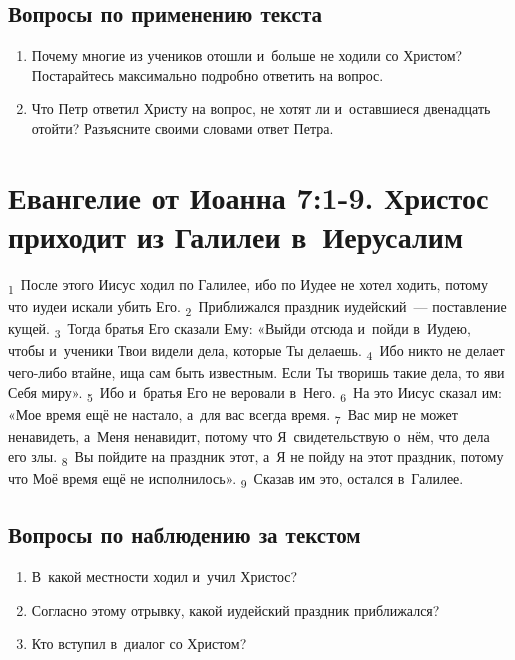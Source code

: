 \documentclass[a4paper,12pt]{article}
\begin{document}
\subsection*{Вопросы по применению текста} 
\begin{enumerate}
    \item Почему многие из учеников отошли и~больше не ходили со Христом? Постарайтесь максимально подробно ответить на вопрос. 
    
    \myline
    
    \myline
    \item Что Петр ответил Христу на вопрос, не хотят ли и~оставшиеся двенадцать отойти? Разъясните своими словами ответ Петра. 
    
    \myline
    
    \myline
\end{enumerate}



\section{Евангелие от Иоанна 7:1-9. Христос приходит из Галилеи в~Иерусалим}

 \textsubscript{1}~После этого Иисус ходил по Галилее, ибо по Иудее не хотел ходить, потому что иудеи искали убить Его. \textsubscript{2}~Приближался праздник иудейский~--- поставление кущей. \textsubscript{3}~Тогда братья Его сказали Ему: «Выйди отсюда и~пойди в~Иудею, чтобы и~ученики Твои видели дела, которые Ты делаешь. \textsubscript{4}~Ибо никто не делает чего-либо втайне, ища сам быть известным. Если Ты творишь такие дела, то яви Себя миру». \textsubscript{5}~Ибо и~братья Его не веровали в~Него. \textsubscript{6}~На это Иисус сказал им: «Мое время ещё не настало, а~для вас всегда время. \textsubscript{7}~Вас мир не может ненавидеть, а~Меня ненавидит, потому что Я~свидетельствую о~нём, что дела его злы. \textsubscript{8}~Вы пойдите на праздник этот, а~Я не пойду на этот праздник, потому что Моё время ещё не исполнилось». \textsubscript{9}~Сказав им это, остался в~Галилее.

\subsection*{Вопросы по наблюдению за текстом}
\begin{enumerate}
    \item В~какой местности ходил и~учил Христос? 
    
    \myline
    
    \item Согласно этому отрывку, какой иудейский праздник приближался? 
    
    \myline
    
    \item Кто вступил в~диалог со Христом? 
    
    \myline
    
\end{enumerate}
\end{document}
